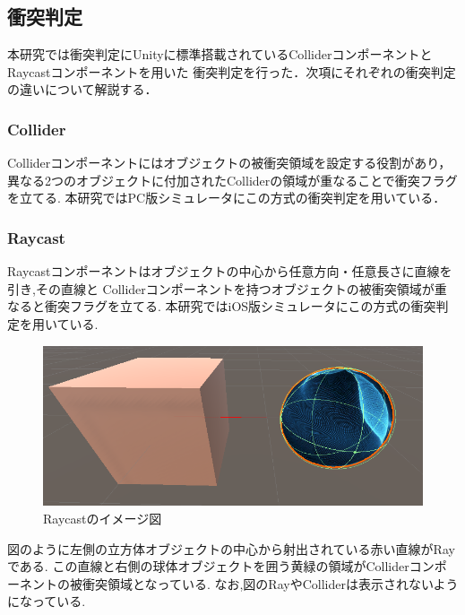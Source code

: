 \documentclass{ltjsreport}
\begin{document}
		\subsection{衝突判定}
			本研究では衝突判定にUnityに標準搭載されているColliderコンポーネントとRaycastコンポーネントを用いた
			衝突判定を行った．次項にそれぞれの衝突判定の違いについて解説する．
			\subsubsection{Collider}
				Colliderコンポーネントにはオブジェクトの被衝突領域を設定する役割があり，
				異なる2つのオブジェクトに付加されたColliderの領域が重なることで衝突フラグを立てる.
				本研究ではPC版シミュレータにこの方式の衝突判定を用いている．

		\subsubsection{Raycast}
			Raycastコンポーネントはオブジェクトの中心から任意方向・任意長さに直線を引き,その直線と
			Colliderコンポーネントを持つオブジェクトの被衝突領域が重なると衝突フラグを立てる.
			本研究ではiOS版シミュレータにこの方式の衝突判定を用いている.
			\begin{figure}[H]
			\centering
			\includegraphics[width = 12cm]{../figs/raycast.png}
			\caption{Raycastのイメージ図}
			\label{fig:Raycast}
			\end{figure}

			図のように左側の立方体オブジェクトの中心から射出されている赤い直線がRayである.
			この直線と右側の球体オブジェクトを囲う黄緑の領域がColliderコンポーネントの被衝突領域となっている.
			なお,図のRayやColliderは表示されないようになっている.
\end{document}
